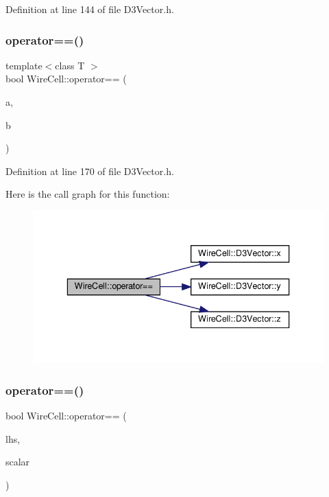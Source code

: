 Definition at line 144 of file D3\+Vector.\+h.

\mbox{\label{namespace_wire_cell_aff8585dbd31c8ec84c1c50f12b1a54d7}} 
\subsubsection{\texorpdfstring{operator==()}{operator==()}\hspace{0.1cm}{\footnotesize\ttfamily [1/3]}}
{\footnotesize\ttfamily template$<$class T $>$ \\
bool Wire\+Cell\+::operator== (\begin{DoxyParamCaption}\item[{const \hyperlink{class_wire_cell_1_1_d3_vector}{D3\+Vector}$<$ T $>$ \&}]{a,  }\item[{const \hyperlink{class_wire_cell_1_1_d3_vector}{D3\+Vector}$<$ T $>$ \&}]{b }\end{DoxyParamCaption})}



Definition at line 170 of file D3\+Vector.\+h.

Here is the call graph for this function\+:
\nopagebreak
\begin{figure}[H]
\begin{center}
\leavevmode
\includegraphics[width=336pt]{namespace_wire_cell_aff8585dbd31c8ec84c1c50f12b1a54d7_cgraph}
\end{center}
\end{figure}
\mbox{\label{namespace_wire_cell_aa6e0b8af0c1d7e1cddab2efdb66c92ae}} 
\subsubsection{\texorpdfstring{operator==()}{operator==()}\hspace{0.1cm}{\footnotesize\ttfamily [2/3]}}
{\footnotesize\ttfamily bool Wire\+Cell\+::operator== (\begin{DoxyParamCaption}\item[{const \hyperlink{class_wire_cell_1_1_quantity}{Wire\+Cell\+::\+Quantity} \&}]{lhs,  }\item[{const double \&}]{scalar }\end{DoxyParamCaption})\hspace{0.3cm}{\ttfamily [inline]}}



